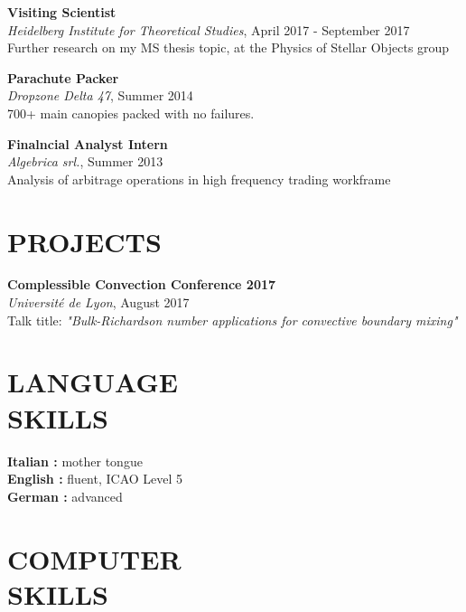 \documentclass[margin]{res}
\begin{document}
\begin{resume}
\textbf{Visiting Scientist}\\
{\sl Heidelberg Institute for Theoretical Studies}, April 2017 - September 2017\\
Further research on my MS thesis topic, at the Physics of Stellar Objects group

\textbf{Parachute Packer}\\
{\sl Dropzone Delta 47}, Summer 2014\\
700+ main canopies packed with no failures.

\textbf{Finalncial Analyst Intern}\\
{\sl Algebrica srl.}, Summer 2013\\
Analysis of arbitrage operations in high frequency trading workframe  

\section{PROJECTS}

\textbf{Complessible Convection Conference 2017}\\
{\sl Université de Lyon}, August 2017\\
Talk title: \textit{"Bulk-Richardson number applications for convective boundary mixing"}  


\section{LANGUAGE\\SKILLS}

\textbf{Italian : } mother tongue
\\
\textbf{English : } fluent, ICAO Level 5
\\
\textbf{German : } advanced

\section{COMPUTER\\SKILLS}


\end{resume}
\end{document}
